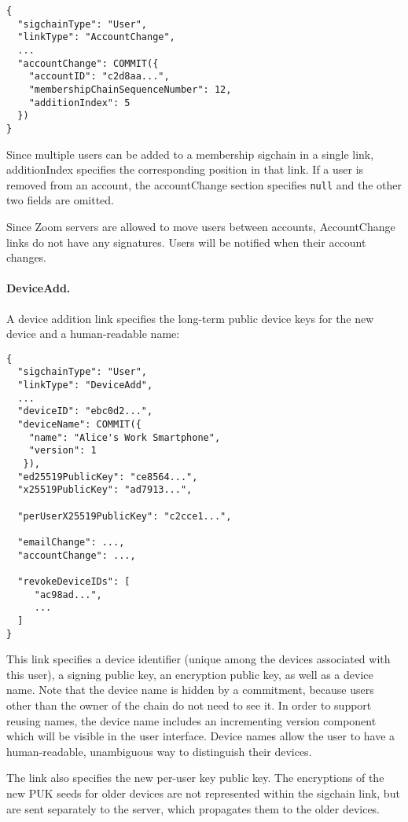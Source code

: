 \begingroup{}
\fontsize{10pt}{12pt}\selectfont{}
\begin{verbatim}
{
  "sigchainType": "User",
  "linkType": "AccountChange",
  ...
  "accountChange": COMMIT({
    "accountID": "c2d8aa...",
    "membershipChainSequenceNumber": 12,
    "additionIndex": 5
  })
}
\end{verbatim}
\endgroup{}

Since multiple users can be added to a membership sigchain in a single link,
\textsf{additionIndex} specifies the corresponding position in that link. If a user
is removed from an account, the \textsf{accountChange} section specifies \accountID
\texttt{null} and the other two fields are omitted.

Since Zoom servers are allowed to move users between accounts, \textsf{AccountChange} links do
not have any signatures. Users will be notified when their account changes.

\paragraph{DeviceAdd.} A device addition link specifies the long-term public device keys for the new
device and a human-readable name:

\begingroup{}
\fontsize{10pt}{12pt}\selectfont{}
\begin{verbatim}
{
  "sigchainType": "User",
  "linkType": "DeviceAdd",
  ...
  "deviceID": "ebc0d2...",
  "deviceName": COMMIT({
    "name": "Alice's Work Smartphone",
    "version": 1
   }),
  "ed25519PublicKey": "ce8564...",
  "x25519PublicKey": "ad7913...",

  "perUserX25519PublicKey": "c2cce1...",

  "emailChange": ...,
  "accountChange": ...,

  "revokeDeviceIDs": [
     "ac98ad...",
     ...
  ]
}
\end{verbatim}
\endgroup{}

This link specifies a device identifier (unique among the devices associated with this user), a
signing public key, an encryption public key, as well as a device name. Note that the device name is
hidden by a commitment, because users other than the owner of the chain do not need to see it. In
order to support reusing names, the device name includes an incrementing version component which
will be visible in the user interface. Device names allow the user to have a human-readable,
unambiguous way to distinguish their devices.

The link also specifies the new per-user key public key. The encryptions of the new PUK seeds for
older devices are not represented within the sigchain link, but are sent separately to the server,
which propagates them to the older devices.

